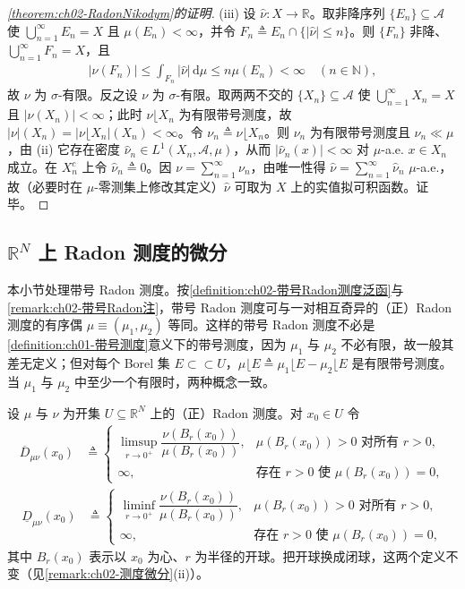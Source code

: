 \documentclass[../../main.tex]{subfiles}%
\begin{document}
\begin{proof}[\cref{theorem:ch02-RadonNikodym}的证明]
(iii) 设 $\hat\nu:X\to\mathbb R$。取非降序列 $\{E_n\}\subseteq\mathscr A$ 使 $\bigcup_{n=1}^\infty E_n=X$ 且 $\mu(E_n)<\infty$，并令 $F_n\triangleq E_n\cap\{|\hat\nu|\leqslant n\}$。则 $\{F_n\}$ 非降、$\bigcup_{n=1}^\infty F_n=X$，且
\begin{align*}
|\nu(F_n)|\leqslant\int_{F_n}|\hat\nu|\,\mathrm{d}\mu\leqslant n\mu(E_n)<\infty\quad(n\in\mathbb N),
\end{align*}
故 $\nu$ 为 $\sigma$-有限。反之设 $\nu$ 为 $\sigma$-有限。取两两不交的 $\{X_n\}\subseteq\mathscr A$ 使 $\bigcup_{n=1}^\infty X_n=X$ 且 $|\nu(X_n)|<\infty$；此时 $\nu\lfloor X_n$ 为有限带号测度，故 $|\nu|(X_n)=|\nu\lfloor X_n|(X_n)<\infty$。令 $\nu_n\triangleq\nu\lfloor X_n$。则 $\nu_n$ 为有限带号测度且 $\nu_n\ll\mu$，由 (ii) 它存在密度 $\hat\nu_n\in L^1(X_n,\mathscr A,\mu)$，从而 $|\hat\nu_n(x)|<\infty$ 对 $\mu$-a.e. $x\in X_n$ 成立。在 $X_n^c$ 上令 $\hat\nu_n\triangleq0$。因 $\nu=\sum_{n=1}^\infty\nu_n$，由唯一性得 $\hat\nu=\sum_{n=1}^\infty\hat\nu_n$ $\mu$-a.e.，故（必要时在 $\mu$-零测集上修改其定义）$\hat\nu$ 可取为 $X$ 上的实值拟可积函数。证毕。
\end{proof}

\subsection{$\mathbb R^N$ 上 Radon 测度的微分}\label{subsection:ch02-RN微分}

本小节处理带号 Radon 测度。按\cref{definition:ch02-带号Radon测度泛函}与\cref{remark:ch02-带号Radon注}，带号 Radon 测度可与一对相互奇异的（正）Radon 测度的有序偶 $\mu\equiv(\mu_1,\mu_2)$ 等同。这样的带号 Radon 测度不必是\cref{definition:ch01-带号测度}意义下的带号测度，因为 $\mu_1$ 与 $\mu_2$ 不必有限，故一般其差无定义；但对每个 Borel 集 $E\subset\subset U$，$\mu\lfloor E\triangleq\mu_1\lfloor E-\mu_2\lfloor E$ 是有限带号测度。当 $\mu_1$ 与 $\mu_2$ 中至少一个有限时，两种概念一致。

设 $\mu$ 与 $\nu$ 为开集 $U\subseteq\mathbb R^N$ 上的（正）Radon 测度。对 $x_0\in U$ 令
\begin{align}
\overline{D}_{\mu\nu}(x_0)&\triangleq
\begin{cases}
\limsup\limits_{r\to0^+}\dfrac{\nu(B_r(x_0))}{\mu(B_r(x_0))}, & \mu(B_r(x_0))>0\text{ 对所有 }r>0,\\[2mm]
\infty, & \text{存在 }r>0\text{ 使 }\mu(B_r(x_0))=0,
\end{cases}
\label{align:ch02-2.83}
\end{align}
\begin{align}
\underline{D}_{\mu\nu}(x_0)&\triangleq
\begin{cases}
\liminf\limits_{r\to0^+}\dfrac{\nu(B_r(x_0))}{\mu(B_r(x_0))}, & \mu(B_r(x_0))>0\text{ 对所有 }r>0,\\[2mm]
\infty, & \text{存在 }r>0\text{ 使 }\mu(B_r(x_0))=0,
\end{cases}
\label{align:ch02-2.84}
\end{align}
其中 $B_r(x_0)$ 表示以 $x_0$ 为心、$r$ 为半径的开球。把开球换成闭球，这两个定义不变（见\cref{remark:ch02-测度微分}(ii)）。
\end{document}
